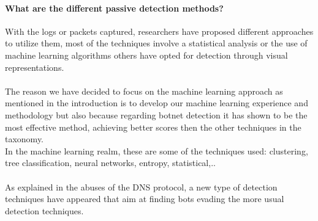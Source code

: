 
\paragraph{What are the different passive detection methods?}
With the logs or packets captured, researchers have proposed different approaches to utilize them, most of the techniques involve a statistical analysis or the use of machine learning algorithms others have opted for detection through visual representations. 
\\\\
The reason we have decided to focus on the machine learning approach as mentioned in the introduction is to develop our machine learning experience and methodology but also because regarding botnet detection it has shown to be the most effective method, achieving better scores then the other techniques in the taxonomy.
\\
In the machine learning realm, these are some of the techniques used: clustering, tree classification, neural networks, entropy, statistical,..
\\\\
As explained in the abuses of the DNS protocol, a new type of detection techniques have appeared that aim at finding bots evading the more usual detection techniques. 

